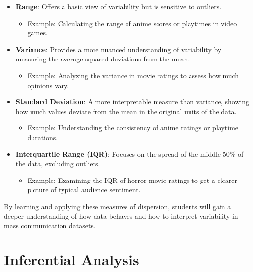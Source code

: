 \documentclass[
]{book}
\providecommand{\tightlist}{%
  \setlength{\itemsep}{0pt}\setlength{\parskip}{0pt}}
\begin{document}
\begin{itemize}
\tightlist
\item
  \textbf{Range}: Offers a basic view of variability but is sensitive to outliers.

  \begin{itemize}
  \tightlist
  \item
    Example: Calculating the range of anime scores or playtimes in video games.
  \end{itemize}
\item
  \textbf{Variance}: Provides a more nuanced understanding of variability by measuring the average squared deviations from the mean.

  \begin{itemize}
  \tightlist
  \item
    Example: Analyzing the variance in movie ratings to assess how much opinions vary.
  \end{itemize}
\item
  \textbf{Standard Deviation}: A more interpretable measure than variance, showing how much values deviate from the mean in the original units of the data.

  \begin{itemize}
  \tightlist
  \item
    Example: Understanding the consistency of anime ratings or playtime durations.
  \end{itemize}
\item
  \textbf{Interquartile Range (IQR)}: Focuses on the spread of the middle 50\% of the data, excluding outliers.

  \begin{itemize}
  \tightlist
  \item
    Example: Examining the IQR of horror movie ratings to get a clearer picture of typical audience sentiment.
  \end{itemize}
\end{itemize}

By learning and applying these measures of dispersion, students will gain a deeper understanding of how data behaves and how to interpret variability in mass communication datasets.

\chapter{Inferential Analysis}\label{inferential-analysis}
\end{document}
